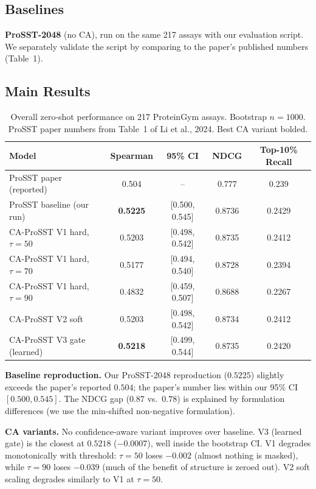 \documentclass[11pt,a4paper]{article}
\begin{document}
\subsection{Baselines}
\textbf{ProSST-2048} (no CA), run on the same 217 assays with our evaluation
script. We separately validate the script by comparing to the paper's
published numbers (Table~1).

\subsection{Main Results}

\begin{table}[h]
\centering
\caption{Overall zero-shot performance on 217 ProteinGym assays. Bootstrap
$n{=}1000$. ProSST paper numbers from Table~1 of Li et al., 2024. Best
CA variant bolded.}
\label{tab:main}
\begin{tabular}{lcccc}
\toprule
Model & Spearman & 95\% CI & NDCG & Top-10\% Recall \\
\midrule
ProSST paper (reported)           & 0.504 & --               & 0.777 & 0.239 \\
ProSST baseline (our run)         & \textbf{0.5225} & [0.500, 0.545] & 0.8736 & 0.2429 \\
\midrule
CA-ProSST V1 hard, $\tau{=}50$     & 0.5203 & [0.498, 0.542] & 0.8735 & 0.2412 \\
CA-ProSST V1 hard, $\tau{=}70$     & 0.5177 & [0.494, 0.540] & 0.8728 & 0.2394 \\
CA-ProSST V1 hard, $\tau{=}90$     & 0.4832 & [0.459, 0.507] & 0.8688 & 0.2267 \\
CA-ProSST V2 soft                  & 0.5203 & [0.498, 0.542] & 0.8734 & 0.2412 \\
CA-ProSST V3 gate (learned)        & \textbf{0.5218} & [0.499, 0.544] & 0.8735 & 0.2420 \\
\bottomrule
\end{tabular}
\end{table}

\textbf{Baseline reproduction.} Our ProSST-2048 reproduction ($0.5225$)
slightly exceeds the paper's reported $0.504$; the paper's number lies
within our 95\% CI $[0.500, 0.545]$. The NDCG gap ($0.87$ vs.\ $0.78$) is
explained by formulation differences (we use the min-shifted non-negative
formulation).

\textbf{CA variants.} No confidence-aware variant improves over baseline.
V3 (learned gate) is the closest at $0.5218$ ($-0.0007$), well inside the
bootstrap CI. V1 degrades monotonically with threshold: $\tau{=}50$ loses
$-0.002$ (almost nothing is masked), while $\tau{=}90$ loses $-0.039$ (much
of the benefit of structure is zeroed out). V2 soft scaling degrades
similarly to V1 at $\tau{=}50$.
\end{document}

